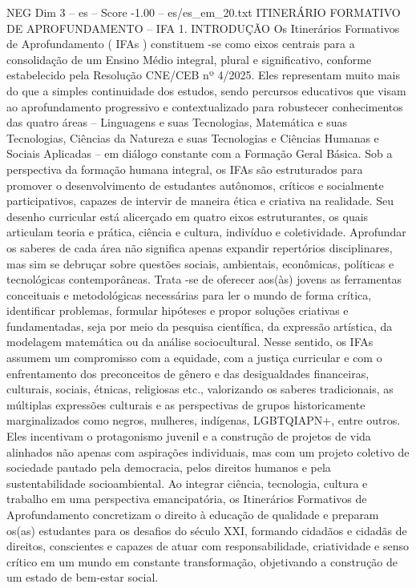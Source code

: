 \begin{textsample}{NEG Dim 3 – es – Score -1.00 – es/es\_em\_20.txt}  \label{ex:f3_neg_175}
ITINERÁRIO FORMATIVO DE APROFUNDAMENTO – IFA 1.
INTRODUÇÃO Os Itinerários Formativos de Aprofundamento ( IFAs ) constituem -se como eixos centrais para a consolidação de um Ensino Médio integral, plural e significativo, conforme estabelecido pela Resolução CNE/CEB nº 4/2025.
Eles representam muito mais do que a simples continuidade dos estudos, sendo percursos educativos que visam ao aprofundamento progressivo e contextualizado para robustecer conhecimentos das quatro áreas – Linguagens e suas Tecnologias, Matemática e suas Tecnologias, Ciências da Natureza e suas Tecnologias e Ciências Humanas e Sociais Aplicadas – em diálogo constante com a Formação Geral Básica.
Sob a perspectiva da formação humana integral, os IFAs são estruturados para promover o desenvolvimento de estudantes autônomos, críticos e socialmente participativos, capazes de intervir de maneira ética e criativa na realidade.
Seu desenho curricular está alicerçado em quatro eixos estruturantes, os quais articulam teoria e prática, ciência e cultura, indivíduo e coletividade.
Aprofundar os saberes de cada área não significa apenas expandir repertórios disciplinares, mas sim se debruçar sobre questões sociais, ambientais, econômicas, políticas e tecnológicas contemporâneas.
Trata -se de oferecer aos(às) jovens as ferramentas conceituais e metodológicas necessárias para ler o mundo de forma crítica, identificar problemas, formular hipóteses e propor soluções criativas e fundamentadas, seja por meio da pesquisa científica, da expressão artística, da modelagem matemática ou da análise sociocultural.
Nesse sentido, os IFAs assumem um compromisso com a equidade, com a justiça curricular e com o enfrentamento dos preconceitos de gênero e das desigualdades financeiras, culturais, sociais, étnicas, religiosas etc., valorizando os saberes tradicionais, as múltiplas expressões culturais e as perspectivas de grupos historicamente marginalizados como negros, mulheres, indígenas, LGBTQIAPN+, entre outros.
Eles incentivam o protagonismo juvenil e a construção de projetos de vida alinhados não apenas com aspirações individuais, mas com um projeto coletivo de sociedade pautado pela democracia, pelos direitos humanos e pela sustentabilidade socioambiental.
Ao integrar ciência, tecnologia, cultura e trabalho em uma perspectiva emancipatória, os Itinerários Formativos de Aprofundamento concretizam o direito à educação de qualidade e preparam os(as) estudantes para os desafios do século XXI, formando cidadãos e cidadãs de direitos, conscientes e capazes de atuar com responsabilidade, criatividade e senso crítico em um mundo em constante transformação, objetivando a construção de um estado de bem-estar social.

\end{textsample}
